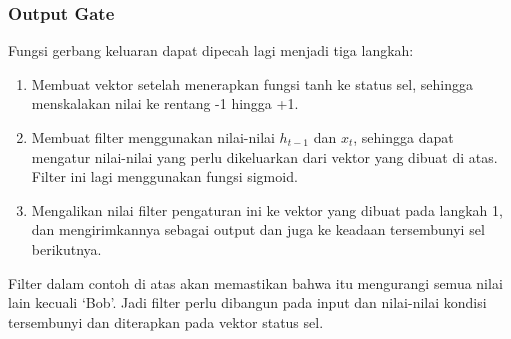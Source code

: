 \documentclass[./skripsi.tex]{subfiles}
\begin{document}
\subsubsection{Output Gate}
\begin{center}
\end{center}
\par Fungsi gerbang keluaran dapat dipecah lagi menjadi tiga langkah:
\begin{enumerate}
    \item Membuat vektor setelah menerapkan fungsi tanh ke status sel, sehingga menskalakan nilai ke rentang -1 hingga +1.
    \item Membuat filter menggunakan nilai-nilai $h_{t-1}$ dan $x_t$, sehingga dapat mengatur nilai-nilai yang perlu dikeluarkan dari vektor yang dibuat di atas. Filter ini lagi menggunakan fungsi sigmoid.
    \item  Mengalikan nilai filter pengaturan ini ke vektor yang dibuat pada langkah 1, dan mengirimkannya sebagai output dan juga ke keadaan tersembunyi sel berikutnya.
\end{enumerate}
Filter dalam contoh di atas akan memastikan bahwa itu mengurangi semua nilai lain kecuali ‘Bob’. Jadi filter perlu dibangun pada input dan nilai-nilai kondisi tersembunyi dan diterapkan pada vektor status sel.
\cite{gers1999learning}
\end{document}
